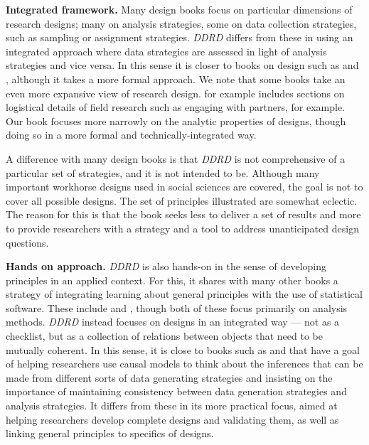\documentclass[11pt]{article}
\begin{document}
\textbf{Integrated framework.} Many design books focus on particular dimensions of research designs; many on analysis strategies, some on data collection strategies, such as sampling or assignment strategies. \textit{DDRD} differs from these in using an integrated approach where data strategies are assessed in light of analysis strategies and vice versa. In this sense it is closer to books on design such as \citet{gerring2011social} and \citet{brady2010rethinking}, although it takes a more formal approach. We note that some books take an even more expansive view of research design. \citet{glennerster2013running} for example includes sections on logistical details of field research such as engaging with partners, for example. Our book focuses more narrowly on the analytic properties of designs, though doing so in a more formal and technically-integrated way. 

A difference with many design books is that \textit{DDRD} is not comprehensive of a particular set of strategies, and it is not intended to be. Although many important workhorse designs used in social sciences are covered, the goal is not to cover all possible designs. The set of principles illustrated are somewhat eclectic. The reason for this is that the book seeks less to deliver a set of results and more to provide researchers with a strategy and a tool to address unanticipated design questions.  

\textbf{Hands on approach.} \textit{DDRD} is also hands-on in the sense of developing principles in an applied context. For this, it shares with many other books a strategy of integrating learning about general principles with the use of statistical software. These include \citet{gelman2006data} and  \citet{james2014introduction}, though both of these focus primarily on analysis methods.  
\textit{DDRD} instead focuses on designs in an integrated way --- not as a checklist, but as a collection of relations between objects that need to be mutually coherent. In this sense, it is close to books such as \citet{Gerber2012} and \citet{dunning2012natural} that have a goal of helping researchers use causal models to think about the inferences that can be made from different sorts of data generating strategies and insisting on the importance of maintaining consistency between data generation strategies and analysis strategies. It differs from these in its more practical focus, aimed at helping researchers develop complete designs and validating them, as well as linking general principles to specifics of designs. 
\end{document}
